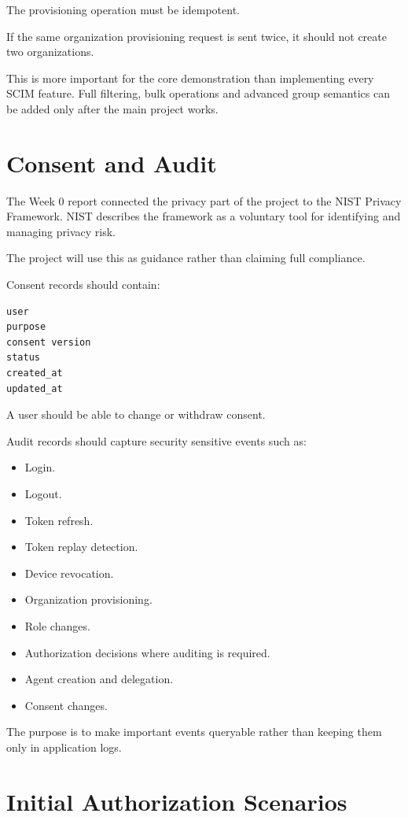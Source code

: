 \documentclass[11pt,a4paper]{article}
\begin{document}
The provisioning operation must be idempotent.

If the same organization provisioning request is sent twice, it should not create two organizations.

This is more important for the core demonstration than implementing every SCIM feature. Full filtering, bulk operations and advanced group semantics can be added only after the main project works.

\section{Consent and Audit}

The Week 0 report connected the privacy part of the project to the NIST Privacy Framework. NIST describes the framework as a voluntary tool for identifying and managing privacy risk. \cite{nistprivacy}

The project will use this as guidance rather than claiming full compliance.

Consent records should contain:

\begin{verbatim}
user
purpose
consent version
status
created_at
updated_at
\end{verbatim}

A user should be able to change or withdraw consent.

Audit records should capture security sensitive events such as:

\begin{itemize}
    \item Login.
    \item Logout.
    \item Token refresh.
    \item Token replay detection.
    \item Device revocation.
    \item Organization provisioning.
    \item Role changes.
    \item Authorization decisions where auditing is required.
    \item Agent creation and delegation.
    \item Consent changes.
\end{itemize}

The purpose is to make important events queryable rather than keeping them only in application logs.

\section{Initial Authorization Scenarios}
\end{document}
